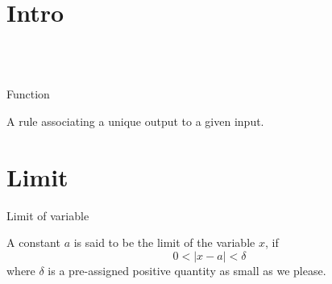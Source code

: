 
\section*{Intro}

\begin{minipage}{0.45\textwidth}
\end{minipage}
\begin{minipage}{0.45\textwidth}
\end{minipage} \\~\\

\begin{definition*}{Function}

    A rule associating a unique output to a given input.
\end{definition*}



\section{Limit}

\begin{center}
\end{center}

\begin{definition*}{Limit of variable}

    A constant $a$ is said to be the limit of the variable $x$, if \[
        0 < |x-a| < \delta
    \] where $\delta$ is a pre-assigned positive quantity as small as we please.
\end{definition*}


